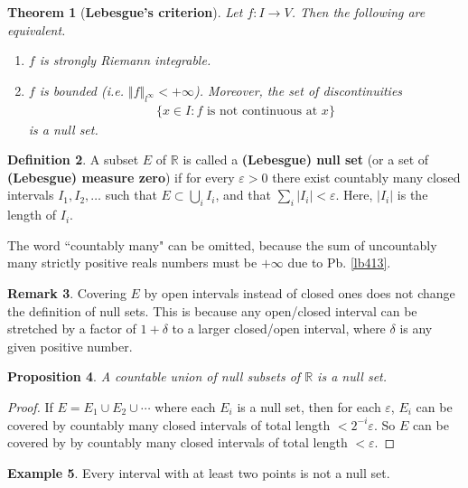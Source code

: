 \documentclass[12pt,b5paper,notitlepage]{article}
\theoremstyle{definition}
\newtheorem{df}{Definition}[section]
\newtheorem{eg}[df]{Example}
\newtheorem{rem}[df]{Remark}
\theoremstyle{plain}
\newtheorem{thm}[df]{Theorem}
\newtheorem{pp}[df]{Proposition}
\newcommand{\Rbb}{\mathbb R}
\newcommand{\eps}{\varepsilon}
\numberwithin{equation}{section}
\begin{document}
\begin{thm}[\textbf{Lebesgue's criterion}]   \label{lb411}
Let $f:I\rightarrow V$. Then the following are equivalent.
\begin{enumerate}[label=(\arabic*)]
\item $f$ is strongly Riemann integrable.
\item $f$ is bounded (i.e. $\Vert f\Vert_{l^\infty}<+\infty$). Moreover, the set of discontinuities
\begin{align}
\{x\in I:f\text{ is not continuous at }x\}
\end{align}
is a null set.
\end{enumerate}
\end{thm}


\begin{df}\label{lb409}
A subset $E$ of $\Rbb$ is called a  \textbf{(Lebesgue) null set}  (or a set of \textbf{(Lebesgue) measure zero}) if for every $\eps>0$ there exist countably many closed intervals $I_1,I_2,\dots$ such that $E\subset\bigcup_i I_i$, and that $\sum_i |I_i|<\eps$. Here, $|I_i|$ is the length of $I_i$.
\end{df}

The word ``countably many" can be omitted, because the sum of uncountably many strictly positive reals numbers must be $+\infty$ due to Pb. \ref{lb413}.

\begin{rem}
Covering $E$ by open intervals instead of closed ones does not change the definition of null sets. This is because any open/closed interval can be stretched by a factor of $1+\delta$ to a larger closed/open interval, where $\delta$ is any given positive number.
\end{rem}


\begin{pp}\label{lb412}
A countable union of null subsets of $\Rbb$ is a null set.
\end{pp}

\begin{proof}
If $E=E_1\cup E_2\cup\cdots$ where each $E_i$ is a null set, then for each $\eps$, $E_i$ can be covered by countably many closed intervals of total length $<2^{-i}\eps$. So $E$ can be covered by by countably many closed intervals of total length $<\eps$.
\end{proof}


\begin{eg}
Every interval with at least two points is not a null set.
\end{eg}
\end{document}

